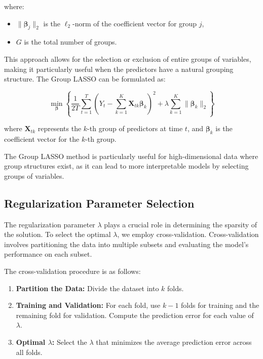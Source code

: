 \documentclass[11pt]{article}
\begin{document}
where:
\begin{itemize}
    \item \(\|\boldsymbol{\beta}_j\|_2\) is the \(\ell_2\)-norm of the coefficient vector for group \(j\),
    \item \(G\) is the total number of groups.
\end{itemize}

This approach allows for the selection or exclusion of entire groups of variables, making it particularly useful when the predictors have a natural grouping structure. The Group LASSO can be formulated as:

\begin{equation}
\min_{\boldsymbol{\beta}} \left\{ \frac{1}{2T} \sum_{t=1}^T \left( Y_t - \sum_{k=1}^K \mathbf{X}_{tk} \boldsymbol{\beta}_k \right)^2 + \lambda \sum_{k=1}^K \|\boldsymbol{\beta}_k\|_2 \right\}
\end{equation}

where \(\mathbf{X}_{tk}\) represents the \(k\)-th group of predictors at time \(t\), and \(\boldsymbol{\beta}_k\) is the coefficient vector for the \(k\)-th group.

The Group LASSO method is particularly useful for high-dimensional data where group structures exist, as it can lead to more interpretable models by selecting groups of variables.

\subsection{Regularization Parameter Selection}

The regularization parameter \(\lambda\) plays a crucial role in determining the sparsity of the solution. To select the optimal \(\lambda\), we employ cross-validation. Cross-validation involves partitioning the data into multiple subsets and evaluating the model's performance on each subset.

The cross-validation procedure is as follows:
\begin{enumerate}
    \item \textbf{Partition the Data:} Divide the dataset into \(k\) folds.
    \item \textbf{Training and Validation:} For each fold, use \(k-1\) folds for training and the remaining fold for validation. Compute the prediction error for each value of \(\lambda\).
    \item \textbf{Optimal \(\lambda\):} Select the \(\lambda\) that minimizes the average prediction error across all folds.
\end{enumerate}
\end{document}
